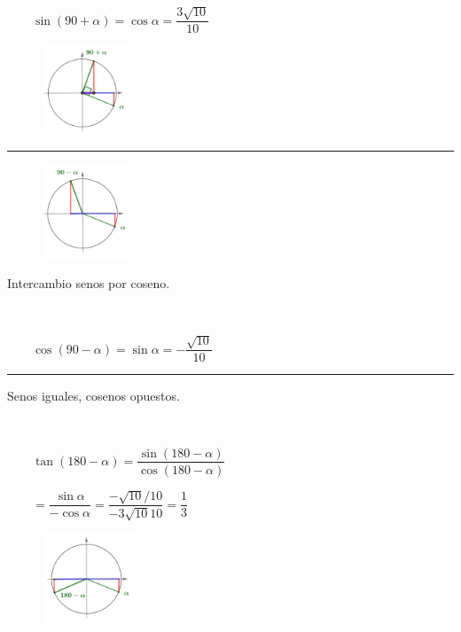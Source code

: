 \begin{miejercicio}
\begin{multicols}{2}
$\quad$

$\qquad \sin (90+\alpha)=\cos \alpha=\dfrac{3\sqrt{10}}{10}$
\begin{figure}[H]
	\centering
	\includegraphics[width=0.23\textwidth]{img-rt/rt17.png}
	\end{figure}	
\end{multicols}
\vspace{-6mm}
\begin{center} 
\vspace{-5mm}
\rule{300pt}{0.1pt} \end{center}

\begin{multicols}{2}
\begin{figure}[H]
	\centering
	\includegraphics[width=0.23\textwidth]{img-rt/rt18.png}
	\end{figure}	
Intercambio senos por coseno.

$\quad$

$\qquad \cos(90-\alpha)=\sin\alpha=-\dfrac{\sqrt{10}}{10}$
\end{multicols}

\begin{center} 
\vspace{-6mm}
\rule{300pt}{0.1pt} \end{center}

\begin{multicols}{2}
Senos iguales, cosenos opuestos.

$\quad$

$\qquad \tan (180-\alpha)=\dfrac{\sin(180-\alpha)}{\cos(180-\alpha)}$


$\qquad =\dfrac{\sin \alpha}{-\cos \alpha}= \dfrac{-\sqrt{10}/10}{-3\sqrt{10}{10}}=\dfrac 1 3$
	\begin{figure}[H]
	\centering
	\includegraphics[width=0.25\textwidth]{img-rt/rt19.png}
	\end{figure}
\end{multicols}


\end{miejercicio}
